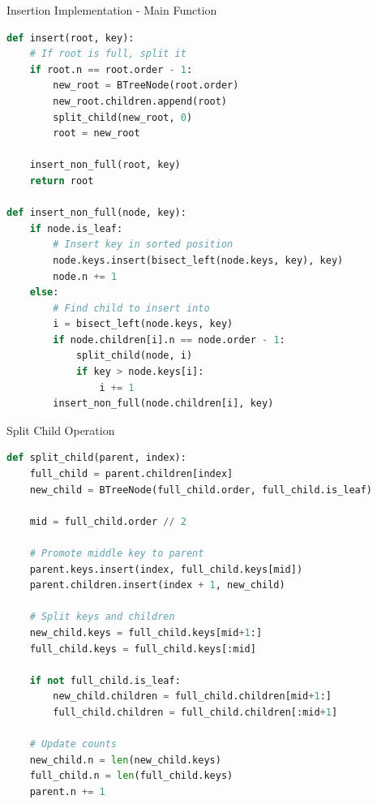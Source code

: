 \documentclass[aspectratio=169]{beamer}
\begin{document}
\begin{frame}[fragile]{Insertion Implementation - Main Function}
\begin{lstlisting}[language=Python, basicstyle=\ttfamily\tiny]
def insert(root, key):
    # If root is full, split it
    if root.n == root.order - 1:
        new_root = BTreeNode(root.order)
        new_root.children.append(root)
        split_child(new_root, 0)
        root = new_root

    insert_non_full(root, key)
    return root

def insert_non_full(node, key):
    if node.is_leaf:
        # Insert key in sorted position
        node.keys.insert(bisect_left(node.keys, key), key)
        node.n += 1
    else:
        # Find child to insert into
        i = bisect_left(node.keys, key)
        if node.children[i].n == node.order - 1:
            split_child(node, i)
            if key > node.keys[i]:
                i += 1
        insert_non_full(node.children[i], key)
\end{lstlisting}
\end{frame}

\begin{frame}[fragile]{Split Child Operation}
\begin{lstlisting}[language=Python, basicstyle=\ttfamily\tiny]
def split_child(parent, index):
    full_child = parent.children[index]
    new_child = BTreeNode(full_child.order, full_child.is_leaf)

    mid = full_child.order // 2

    # Promote middle key to parent
    parent.keys.insert(index, full_child.keys[mid])
    parent.children.insert(index + 1, new_child)

    # Split keys and children
    new_child.keys = full_child.keys[mid+1:]
    full_child.keys = full_child.keys[:mid]

    if not full_child.is_leaf:
        new_child.children = full_child.children[mid+1:]
        full_child.children = full_child.children[:mid+1]

    # Update counts
    new_child.n = len(new_child.keys)
    full_child.n = len(full_child.keys)
    parent.n += 1
\end{lstlisting}
\end{frame}
\end{document}
